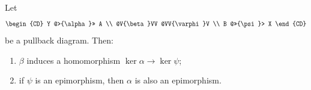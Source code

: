 Let
$$
\begin{CD}
Y @>{\alpha}>> A \\
@V{\beta}VV @VV{\varphi}V \\
B @>>{\psi}> X
\end{CD}
$$
be a pullback diagram. Then:
\begin{enumerate}
\item[(i)] $\beta$ induces a homomorphism $\ker \alpha \to \ker \psi$;
\item[(ii)] if $\psi$ is an epimorphism, then $\alpha$ is also an epimorphism.
\end{enumerate}
